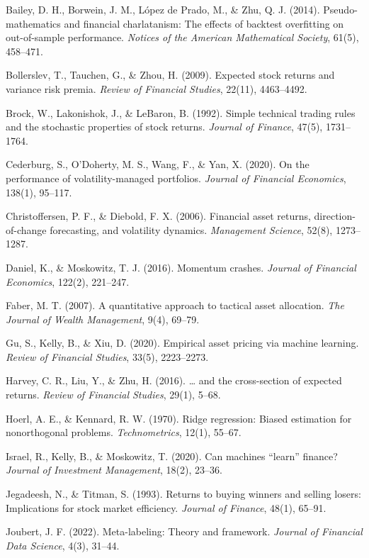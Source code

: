\documentclass[11pt]{article}
\newenvironment{reflist}{\begin{list}{}{\setlength{\leftmargin}{1.5em}\setlength{\itemindent}{-1.5em}\setlength{\itemsep}{3pt}\setlength{\parsep}{0pt}}}{\end{list}}
\begin{document}
\begin{reflist}
\item
  Bailey, D. H., Borwein, J. M., López de Prado, M., \& Zhu, Q. J. (2014). Pseudo-mathematics and financial charlatanism: The effects of backtest overfitting on out-of-sample performance. \emph{Notices of the American Mathematical Society}, 61(5), 458--471.
\item
  Bollerslev, T., Tauchen, G., \& Zhou, H. (2009). Expected stock returns and variance risk premia. \emph{Review of Financial Studies}, 22(11), 4463--4492.
\item
  Brock, W., Lakonishok, J., \& LeBaron, B. (1992). Simple technical trading rules and the stochastic properties of stock returns. \emph{Journal of Finance}, 47(5), 1731--1764.
\item
  Cederburg, S., O'Doherty, M. S., Wang, F., \& Yan, X. (2020). On the performance of volatility-managed portfolios. \emph{Journal of Financial Economics}, 138(1), 95--117.
\item
  Christoffersen, P. F., \& Diebold, F. X. (2006). Financial asset returns, direction-of-change forecasting, and volatility dynamics. \emph{Management Science}, 52(8), 1273--1287.
\item
  Daniel, K., \& Moskowitz, T. J. (2016). Momentum crashes. \emph{Journal of Financial Economics}, 122(2), 221--247.
\item
  Faber, M. T. (2007). A quantitative approach to tactical asset allocation. \emph{The Journal of Wealth Management}, 9(4), 69--79.
\item
  Gu, S., Kelly, B., \& Xiu, D. (2020). Empirical asset pricing via machine learning. \emph{Review of Financial Studies}, 33(5), 2223--2273.
\item
  Harvey, C. R., Liu, Y., \& Zhu, H. (2016). \ldots{} and the cross-section of expected returns. \emph{Review of Financial Studies}, 29(1), 5--68.
\item
  Hoerl, A. E., \& Kennard, R. W. (1970). Ridge regression: Biased estimation for nonorthogonal problems. \emph{Technometrics}, 12(1), 55--67.
\item
  Israel, R., Kelly, B., \& Moskowitz, T. (2020). Can machines ``learn'' finance? \emph{Journal of Investment Management}, 18(2), 23--36.
\item
  Jegadeesh, N., \& Titman, S. (1993). Returns to buying winners and selling losers: Implications for stock market efficiency. \emph{Journal of Finance}, 48(1), 65--91.
\item
  Joubert, J. F. (2022). Meta-labeling: Theory and framework. \emph{Journal of Financial Data Science}, 4(3), 31--44.

\end{reflist}
\end{document}
